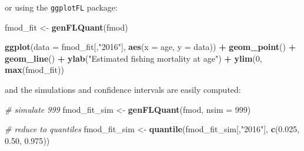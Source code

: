 \documentclass[
]{book}
\newenvironment{Shaded}{\begin{snugshade}}{\end{snugshade}}
\newcommand{\AttributeTok}[1]{\textcolor[rgb]{0.13,0.29,0.53}{#1}}
\newcommand{\CommentTok}[1]{\textcolor[rgb]{0.56,0.35,0.01}{\textit{#1}}}
\newcommand{\DecValTok}[1]{\textcolor[rgb]{0.00,0.00,0.81}{#1}}
\newcommand{\FloatTok}[1]{\textcolor[rgb]{0.00,0.00,0.81}{#1}}
\newcommand{\FunctionTok}[1]{\textcolor[rgb]{0.13,0.29,0.53}{\textbf{#1}}}
\newcommand{\NormalTok}[1]{#1}
\newcommand{\OtherTok}[1]{\textcolor[rgb]{0.56,0.35,0.01}{#1}}
\newcommand{\SpecialCharTok}[1]{\textcolor[rgb]{0.81,0.36,0.00}{\textbf{#1}}}
\newcommand{\StringTok}[1]{\textcolor[rgb]{0.31,0.60,0.02}{#1}}
\begin{document}
\begin{Shaded}
\end{Shaded}

or using the \texttt{ggplotFL} package:

\begin{Shaded}
\begin{Highlighting}[]
\NormalTok{ fmod\_fit }\OtherTok{\textless{}{-}} \FunctionTok{genFLQuant}\NormalTok{(fmod)}

 \FunctionTok{ggplot}\NormalTok{(}\AttributeTok{data =}\NormalTok{ fmod\_fit[,}\StringTok{"2016"}\NormalTok{], }\FunctionTok{aes}\NormalTok{(}\AttributeTok{x =}\NormalTok{ age, }\AttributeTok{y =}\NormalTok{ data)) }\SpecialCharTok{+} 
   \FunctionTok{geom\_point}\NormalTok{() }\SpecialCharTok{+} \FunctionTok{geom\_line}\NormalTok{() }\SpecialCharTok{+} 
   \FunctionTok{ylab}\NormalTok{(}\StringTok{"Estimated fishing mortality at age"}\NormalTok{) }\SpecialCharTok{+}
   \FunctionTok{ylim}\NormalTok{(}\DecValTok{0}\NormalTok{, }\FunctionTok{max}\NormalTok{(fmod\_fit))}
\end{Highlighting}
\end{Shaded}

and the simulations and confidence intervals are easily computed:

\begin{Shaded}
\begin{Highlighting}[]
 \CommentTok{\# simulate 999 }
\NormalTok{ fmod\_fit\_sim }\OtherTok{\textless{}{-}} \FunctionTok{genFLQuant}\NormalTok{(fmod, }\AttributeTok{nsim =} \DecValTok{999}\NormalTok{)}

 \CommentTok{\# reduce to quantiles}
\NormalTok{ fmod\_fit\_sim }\OtherTok{\textless{}{-}} \FunctionTok{quantile}\NormalTok{(fmod\_fit\_sim[,}\StringTok{"2016"}\NormalTok{], }\FunctionTok{c}\NormalTok{(}\FloatTok{0.025}\NormalTok{, }\FloatTok{0.50}\NormalTok{, }\FloatTok{0.975}\NormalTok{))}
\end{Highlighting}
\end{Shaded}
\end{document}
